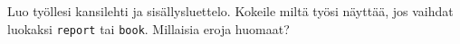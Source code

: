     \begin{harj}
        Luo työllesi kansilehti ja sisällysluettelo. Kokeile miltä työsi näyttää, jos vaihdat luokaksi \verb-report- tai \verb-book-. Millaisia eroja huomaat? 
    \end{harj}
